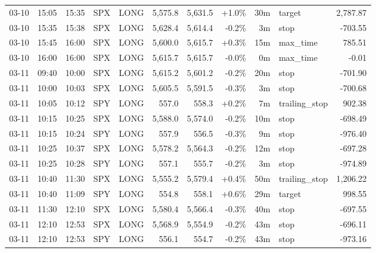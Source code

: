 \documentclass[11pt,a4paper,twoside]{article}
\begin{document}
\begin{center}
\begin{longtable}{>{\color{txtmain}}l l l l l r r r r >{\color{txtmain}}l r}
03-10 & 15:05 & 15:35 & SPX & LONG & 5,575.8 & 5,631.5 & \textcolor{wingreen}{+1.0\%} & 30m & target & \textcolor{wingreen}{2,787.87} \\
03-10 & 15:35 & 15:38 & SPX & LONG & 5,628.4 & 5,614.4 & \textcolor{lossred}{-0.2\%} & 3m & stop & \textcolor{lossred}{-703.55} \\
03-10 & 15:45 & 16:00 & SPX & LONG & 5,600.0 & 5,615.7 & \textcolor{wingreen}{+0.3\%} & 15m & max\_time & \textcolor{wingreen}{785.51} \\
03-10 & 16:00 & 16:00 & SPX & LONG & 5,615.7 & 5,615.7 & \textcolor{lossred}{-0.0\%} & 0m & max\_time & \textcolor{lossred}{-0.01} \\
03-11 & 09:40 & 10:00 & SPX & LONG & 5,615.2 & 5,601.2 & \textcolor{lossred}{-0.2\%} & 20m & stop & \textcolor{lossred}{-701.90} \\
03-11 & 10:00 & 10:03 & SPX & LONG & 5,605.5 & 5,591.5 & \textcolor{lossred}{-0.3\%} & 3m & stop & \textcolor{lossred}{-700.68} \\
03-11 & 10:05 & 10:12 & SPY & LONG & 557.0 & 558.3 & \textcolor{wingreen}{+0.2\%} & 7m & trailing\_stop & \textcolor{wingreen}{902.38} \\
03-11 & 10:15 & 10:25 & SPX & LONG & 5,588.0 & 5,574.0 & \textcolor{lossred}{-0.2\%} & 10m & stop & \textcolor{lossred}{-698.49} \\
03-11 & 10:15 & 10:24 & SPY & LONG & 557.9 & 556.5 & \textcolor{lossred}{-0.3\%} & 9m & stop & \textcolor{lossred}{-976.40} \\
03-11 & 10:25 & 10:37 & SPX & LONG & 5,578.2 & 5,564.3 & \textcolor{lossred}{-0.2\%} & 12m & stop & \textcolor{lossred}{-697.28} \\
03-11 & 10:25 & 10:28 & SPY & LONG & 557.1 & 555.7 & \textcolor{lossred}{-0.2\%} & 3m & stop & \textcolor{lossred}{-974.89} \\
03-11 & 10:40 & 11:30 & SPX & LONG & 5,555.2 & 5,579.4 & \textcolor{wingreen}{+0.4\%} & 50m & trailing\_stop & \textcolor{wingreen}{1,206.22} \\
03-11 & 10:40 & 11:09 & SPY & LONG & 554.8 & 558.1 & \textcolor{wingreen}{+0.6\%} & 29m & target & \textcolor{wingreen}{998.55} \\
03-11 & 11:30 & 12:10 & SPX & LONG & 5,580.4 & 5,566.4 & \textcolor{lossred}{-0.3\%} & 40m & stop & \textcolor{lossred}{-697.55} \\
03-11 & 12:10 & 12:53 & SPX & LONG & 5,568.9 & 5,554.9 & \textcolor{lossred}{-0.2\%} & 43m & stop & \textcolor{lossred}{-696.11} \\
03-11 & 12:10 & 12:53 & SPY & LONG & 556.1 & 554.7 & \textcolor{lossred}{-0.2\%} & 43m & stop & \textcolor{lossred}{-973.16} \\

\end{longtable}
\end{center}
\end{document}

